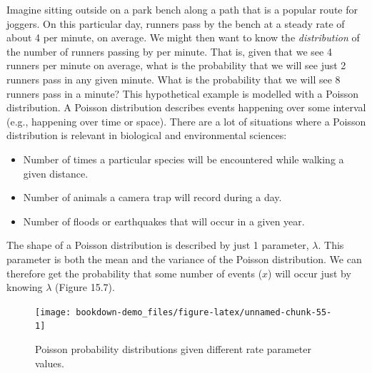 \documentclass[
  openany]{scrbook}
\providecommand{\tightlist}{%
  \setlength{\itemsep}{0pt}\setlength{\parskip}{0pt}}
\begin{document}
Imagine sitting outside on a park bench along a path that is a popular route for joggers.
On this particular day, runners pass by the bench at a steady rate of about 4 per minute, on average.
We might then want to know the \emph{distribution} of the number of runners passing by per minute.
That is, given that we see 4 runners per minute on average, what is the probability that we will see just 2 runners pass in any given minute.
What is the probability that we will see 8 runners pass in a minute?
This hypothetical example is modelled with a Poisson distribution.
A Poisson distribution describes events happening over some interval (e.g., happening over time or space).
There are a lot of situations where a Poisson distribution is relevant in biological and environmental sciences:

\begin{itemize}
\tightlist
\item
  Number of times a particular species will be encountered while walking a given distance.
\item
  Number of animals a camera trap will record during a day.
\item
  Number of floods or earthquakes that will occur in a given year.
\end{itemize}

The shape of a Poisson distribution is described by just 1 parameter, \(\lambda\).
This parameter is both the mean and the variance of the Poisson distribution.
We can therefore get the probability that some number of events (\(x\)) will occur just by knowing \(\lambda\) (Figure 15.7).

\begin{figure}
\texttt{[image: bookdown-demo\_files/figure-latex/unnamed-chunk-55-1]} \caption{Poisson probability distributions given different rate parameter values.}\label{fig:unnamed-chunk-55}
\end{figure}
\end{document}
